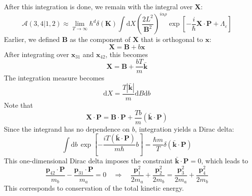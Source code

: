 After this integration is done, we remain with the integral over $\mathbf{X}$:
\begin{equation}
	\mathcal{A}(3,4|1,2) \approx \lim_{T \rightarrow \infty} \hbar^{d} \delta(\mathbf{K}) \int \mathrm{d}X \left( \frac{2 L^{2}}{\mathbf{B}^{2}} \right)^{i \alpha \rho} \exp{\left[ -\frac{i}{\hbar} \mathbf{X} \cdot \mathbf{P} + \Lambda_{\varepsilon} \right]}
\end{equation}
Earlier, we defined $\mathbf{B}$ as the component of $\mathbf{X}$ that is orthogonal to $\mathbf{x}$:
\begin{equation}
	\mathbf{X} = \mathbf{B} + b \mathbf{x}
\end{equation}
After integrating over $\mathbf{x}_{31}$ and $\mathbf{x}_{42}$, this becomes
\begin{equation}
	\mathbf{X} = \mathbf{B} + \frac{b T}{m} \bar{\mathbf{k}}
\end{equation}
The integration measure becomes
\begin{equation}
	\mathrm{d}X = \frac{T |\bar{\mathbf{k}}|}{m} \mathrm{d}B \mathrm{d}b
\end{equation}
Note that
\begin{equation}
	\mathbf{X} \cdot \mathbf{P} = \mathbf{B} \cdot \mathbf{P} + \frac{T b}{m} (\bar{\mathbf{k}} \cdot \mathbf{P})
\end{equation}
Since the integrand has no dependence on $b$, integration yields a Dirac delta:
\begin{equation}
	\int \mathrm{d}b \, \exp{\left[- \frac{i T (\bar{\mathbf{k}} \cdot \mathbf{P})}{m \hbar} b \right]} = \frac{\hbar m}{T} \delta(\bar{\mathbf{k}} \cdot \mathbf{P})
\end{equation}
This one-dimensional Dirac delta imposes the constraint $\bar{\mathbf{k}} \cdot \mathbf{P} = 0$, which leads to
\begin{equation}
	\frac{\mathbf{p}_{42} \cdot \mathbf{P}}{m_{b}} - \frac{\mathbf{p}_{31} \cdot \mathbf{P}}{m_{a}} = 0 \quad \Longrightarrow \quad \frac{\mathbf{p}_{1}^{2}}{2 m_{a}} + \frac{\mathbf{p}_{2}^{2}}{2m_{b}} = \frac{\mathbf{p}_{3}^{2}}{2 m_{a}} + \frac{\mathbf{p}_{4}^{2}}{2m_{b}}
\end{equation}
This corresponds to conservation of the total kinetic energy.

